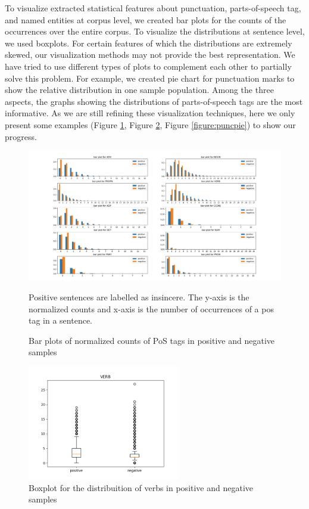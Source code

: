 \documentclass[12pt]{diazessay} %
\begin{document}
To visualize extracted statistical features about punctuation, parts-of-speech tag, and named entities at corpus level, we created bar plots for the counts of the occurrences over the entire corpus. To visualize the distributions at sentence level, we used boxplots. For certain features of which the distributions are extremely skewed, our visualization methods may not provide the best representation. We have tried to use different types of plots to complement each other to partially solve this problem. For example, we created pie chart for punctuation marks to show the relative distribution in one sample population. Among the three aspects, the graphs showing the distributions of parts-of-speech tags are the most informative. As we are still refining these visualization techniques, here we only present some examples (Figure \ref{figure:pos_bar}, Figure \ref{figure:verb_box}, Figure \ref{figure:puncpie}) to show our progress. 

\begin{figure}[ht]
	\centering
	\includegraphics[width=\textwidth]{graphs/pos_bar.jpeg}
	\caption{Bar plots of normalized counts of PoS tags in positive and negative samples}
	\medskip
	\small
	Positive sentences are labelled as insincere. The y-axis is the normalized counts and x-axis is the number of occurrences of a pos tag in a sentence. 
	\label{figure:pos_bar}
\end{figure}


\begin{figure}[ht] 
	\includegraphics[height=5cm, center]{graphs/verb.png}
	\caption{Boxplot for the distribuition of verbs in positive and negative samples}
	\medskip
	\small
	\label{figure:verb_box}

\end{figure}
\end{document}
